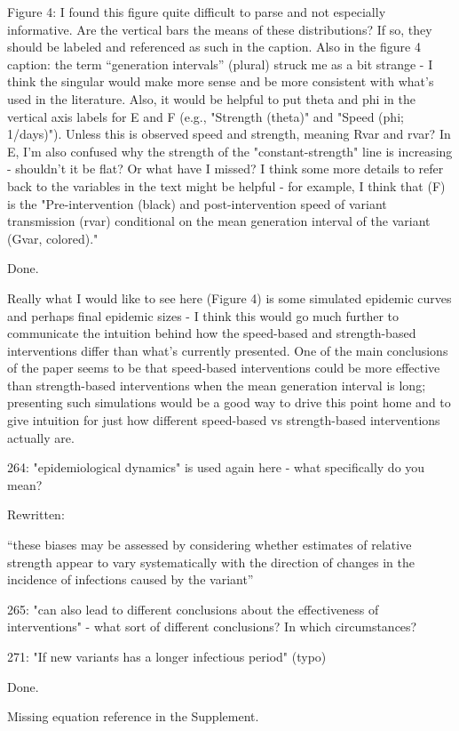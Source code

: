 \documentclass[12pt]{article}
\newcommand{\revtext}{\textsf}
\begin{document}
\revtext{Figure 4: I found this figure quite difficult to parse and not especially informative. Are the vertical bars the means of these distributions? If so, they should be labeled and referenced as such in the caption. Also in the figure 4 caption: the term ``generation intervals'' (plural) struck me as a bit strange - I think the singular would make more sense and be more consistent with what's used in the literature. Also, it would be helpful to put theta and phi in the vertical axis labels for E and F (e.g., "Strength (theta)" and "Speed (phi; 1/days)"). Unless this is observed speed and strength, meaning Rvar and rvar? In E, I'm also confused why the strength of the "constant-strength" line is increasing - shouldn't it be flat? Or what have I missed? I think some more details to refer back to the variables in the text might be helpful - for example, I think that (F) is the "Pre-intervention (black) and post-intervention speed of variant transmission (rvar) conditional on the mean generation interval of the variant (Gvar, colored)."}

Done.

\revtext{Really what I would like to see here (Figure 4) is some simulated epidemic curves and perhaps final epidemic sizes - I think this would go much further to communicate the intuition behind how the speed-based and strength-based interventions differ than what's currently presented. One of the main conclusions of the paper seems to be that speed-based interventions could be more effective than strength-based interventions when the mean generation interval is long; presenting such simulations would be a good way to drive this point home and to give intuition for just how different speed-based vs strength-based interventions actually are.}



\revtext{264: "epidemiological dynamics" is used again here - what specifically do you mean?}

Rewritten:

``these biases may be assessed by considering whether estimates of relative strength appear to vary systematically with the direction of changes in the incidence of infections caused by the variant''

\revtext{265: "can also lead to different conclusions about the effectiveness of interventions" - what sort of different conclusions? In which circumstances?}



\revtext{271: "If new variants has a longer infectious period" (typo)}

Done.

\revtext{Missing equation reference in the Supplement.}


\end{document}
